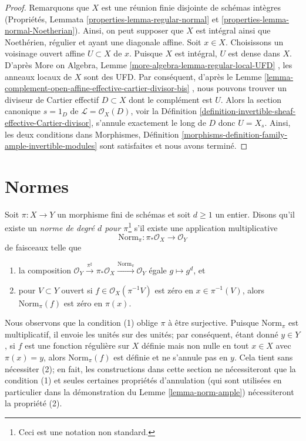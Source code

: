 \begin{proof}
Remarquons que  $X$  est une réunion finie disjointe de schémas intègres
(Propriétés, Lemmata  \ref{properties-lemma-regular-normal}  et  \ref{properties-lemma-normal-Noetherian}). Ainsi, on peut supposer que
 $X$  est intégral ainsi que Noethérien, régulier et ayant une diagonale
affine. Soit  $x \in X$. Choisissons un voisinage ouvert affine  $U \subset X$  de
 $x$. Puisque  $X$  est intégral,  $U$  est dense dans
 $X$. D'après More on Algebra, Lemme  \ref{more-algebra-lemma-regular-local-UFD} , les anneaux locaux de
 $X$  sont des UFD. Par conséquent, d'après le Lemme  \ref{lemma-complement-open-affine-effective-cartier-divisor-bis} , nous
pouvons trouver un diviseur de Cartier effectif  $D \subset X$  dont le complément
est  $U$. Alors la section canonique  $s = 1_D$  de  $\mathcal{L} = \mathcal{O}_X(D)$, voir la
Définition  \ref{definition-invertible-sheaf-effective-Cartier-divisor}, s'annule exactement le long de  $D$  donc
 $U = X_s$. Ainsi, les deux conditions dans Morphismes, Définition  \ref{morphisms-definition-family-ample-invertible-modules} 
sont satisfaites et nous avons terminé.
\end{proof}




\section{Normes}
\label{section-norms}

\noindent
Soit  $\pi : X \to Y$  un morphisme fini de schémas et soit  $d \geq 1$  un entier.
Disons qu'il existe un  {\it  norme de degré  $d$  pour
 $\pi$}\footnote{Ceci est une notation non
standard.}  s'il existe une application multiplicative
$$
\text{Norm}_\pi : \pi_*\mathcal{O}_X \to \mathcal{O}_Y
$$
de faisceaux telle que
\begin{enumerate}
\item la composition  $\mathcal{O}_Y \xrightarrow{\pi^\sharp} \pi_*\mathcal{O}_X
\xrightarrow{\text{Norm}_\pi} \mathcal{O}_Y$  égale  $g \mapsto g^d$, et
\item pour  $V \subset Y$  ouvert si  $f \in \mathcal{O}_X(\pi^{-1}V)$  est zéro en  $x \in \pi^{-1}(V)$, alors
 $\text{Norm}_\pi(f)$  est zéro en  $\pi(x)$.
\end{enumerate}
Nous observons que la condition (1) oblige  $\pi$  à être surjective. Puisque
 $\text{Norm}_\pi$  est multiplicatif, il envoie les unités sur des unités; par
conséquent, étant donné  $y \in Y$, si  $f$  est une fonction régulière
sur  $X$  définie mais non nulle en tout  $x \in X$  avec  $\pi(x) = y$,
alors  $\text{Norm}_\pi(f)$  est définie et ne s'annule pas en  $y$. Cela tient sans
nécessiter (2); en fait, les constructions dans cette section ne nécessiteront que
la condition (1) et seules certaines propriétés d'annulation (qui sont utilisées
en particulier dans la démonstration du Lemme  \ref{lemma-norm-ample}) nécessiteront la
propriété (2).

